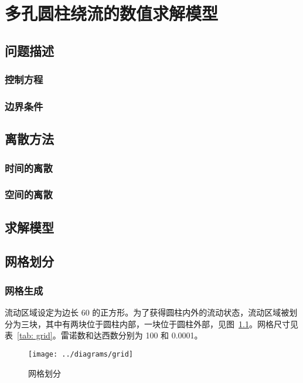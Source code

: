 \chapter{多孔圆柱绕流的数值求解模型}

\section{问题描述}

\subsection{控制方程} %

\subsection{边界条件} %

\section{离散方法}

\subsection{时间的离散}

\subsection{空间的离散}

\section{求解模型} %

\section{网格划分}

\subsection{网格生成}

流动区域设定为边长 60 的正方形。为了获得圆柱内外的流动状态，流动区域被划分为三块，其中有两块位于圆柱内部，一块位于圆柱外部，见图~\ref{fig: grid}。网格尺寸见表~\ref{tab: grid}。雷诺数和达西数分别为 100 和 0.0001。
\begin{figure}
	\centering
	\texttt{[image: ../diagrams/grid]}
	\caption{网格划分}\label{fig: grid}
\end{figure}

